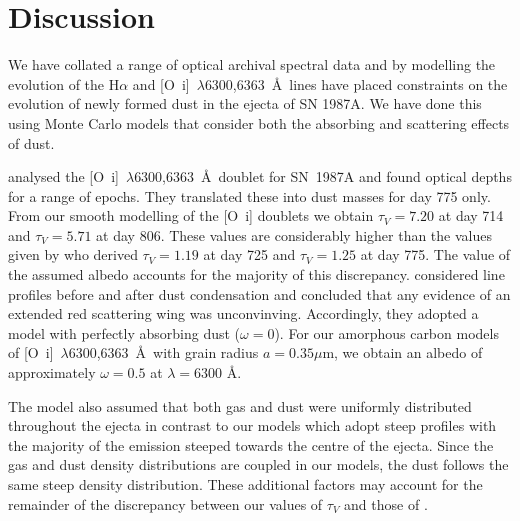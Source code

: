 \documentclass[useAMS,usenatbib,usegraphicx]{mnras}
\begin{document}
\section{Discussion}
\label{discuss}

We have collated a range of optical archival spectral data and by modelling the evolution of the H$\alpha$ and 
[O~{\sc i}]~$\lambda$6300,6363~\AA\ lines have placed constraints on the 
evolution of newly formed dust in the ejecta of SN 1987A. We have done this using Monte Carlo 
models that consider both the absorbing and scattering effects of dust.  


\citet{Lucy1989} analysed the [O~{\sc i}]~$\lambda$6300,6363~\AA\ doublet for SN~1987A and found optical depths for a range of epochs. They translated these into dust masses for day 775 only.  
From our smooth modelling of the [O~{\sc i}] doublets we obtain $\tau_V=7.20$ at day 714 and $\tau_V=5.71$ at day 806.  These values are considerably higher than the values given by \citet{Lucy1989} who derived $\tau_V=1.19$ at day 725 and $\tau_V=1.25$ at day 775.  The value of the assumed albedo accounts for the majority of this discrepancy.  \citet{Lucy1989} considered line profiles before and after dust condensation and concluded that any evidence of an extended red scattering wing was unconvinving.  Accordingly, they adopted a model with perfectly absorbing dust ($\omega = 0$).  For our amorphous carbon models of [O~{\sc i}]~$\lambda$6300,6363~\AA\ with grain radius $a=0.35\mu$m, we obtain an albedo of approximately $\omega = 0.5$ at $\lambda=6300$ \AA.  

The \citet{Lucy1989} model also assumed that both gas and dust were uniformly distributed throughout the ejecta in contrast to our models which adopt steep profiles with the majority of the emission steeped towards the centre of the ejecta.  Since the gas and dust density distributions are coupled in our models, the dust follows the same steep density distribution.  These additional factors may account for the remainder of the discrepancy between our values of $\tau_V$ and those of \citet{Lucy1989}.
\end{document}
